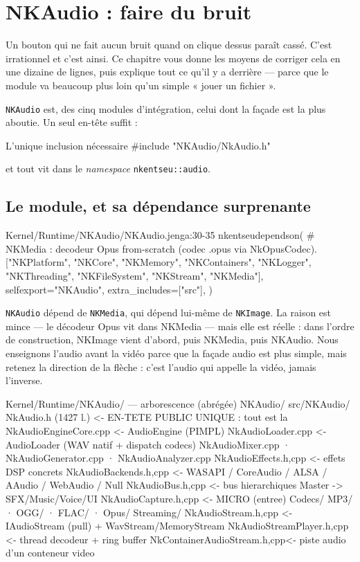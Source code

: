 \chapter{NKAudio : faire du bruit}

Un bouton qui ne fait aucun bruit quand on clique dessus paraît cassé. C'est
irrationnel et c'est ainsi. Ce chapitre vous donne les moyens de corriger cela
en une dizaine de lignes, puis explique tout ce qu'il y a derrière — parce que
le module va beaucoup plus loin qu'un simple « jouer un fichier ».

\texttt{NKAudio} est, des cinq modules d'intégration, celui dont la façade est
la plus aboutie. Un seul en-tête suffit :

\begin{nkcode}{L'unique inclusion nécessaire}
#include "NKAudio/NkAudio.h"
\end{nkcode}

\noindent et tout vit dans le \emph{namespace} \texttt{nkentseu::audio}.

\section{Le module, et sa dépendance surprenante}

\begin{nkcode}{Kernel/Runtime/NKAudio/NKAudio.jenga:30-35}
    nkentseudependson(
        # NKMedia : decodeur Opus from-scratch (codec .opus via NkOpusCodec).
        ["NKPlatform", "NKCore", "NKMemory", "NKContainers", "NKLogger", "NKThreading", "NKFileSystem", "NKStream", "NKMedia"],
        selfexport="NKAudio",
        extra_includes=["src"],
    )
\end{nkcode}

\texttt{NKAudio} dépend de \texttt{NKMedia}, qui dépend lui-même de
\texttt{NKImage}. La raison est mince — le décodeur Opus vit dans NKMedia — mais
elle est réelle : dans l'ordre de construction, NKImage vient d'abord, puis
NKMedia, puis NKAudio. Nous enseignons l'audio avant la vidéo parce que la
façade audio est plus simple, mais retenez la direction de la flèche : c'est
l'audio qui appelle la vidéo, jamais l'inverse.

\begin{nkcode}{Kernel/Runtime/NKAudio/ — arborescence (abrégée)}
NKAudio/
  src/NKAudio/
    NkAudio.h            (1427 l.)  <- EN-TETE PUBLIC UNIQUE : tout est la
    NkAudioEngineCore.cpp           <- AudioEngine (PIMPL)
    NkAudioLoader.cpp               <- AudioLoader (WAV natif + dispatch codecs)
    NkAudioMixer.cpp · NkAudioGenerator.cpp · NkAudioAnalyzer.cpp
    NkAudioEffects.{h,cpp}          <- effets DSP concrets
    NkAudioBackends.{h,cpp}         <- WASAPI / CoreAudio / ALSA / AAudio / WebAudio / Null
    NkAudioBus.{h,cpp}              <- bus hierarchiques Master -> SFX/Music/Voice/UI
    NkAudioCapture.{h,cpp}          <- MICRO (entree)
    Codecs/  MP3/ · OGG/ · FLAC/ · Opus/
    Streaming/
      NkAudioStream.{h,cpp}         <- IAudioStream (pull) + WavStream/MemoryStream
      NkAudioStreamPlayer.{h,cpp}   <- thread decodeur + ring buffer
      NkContainerAudioStream.{h,cpp}<- piste audio d'un conteneur video
\end{nkcode}

